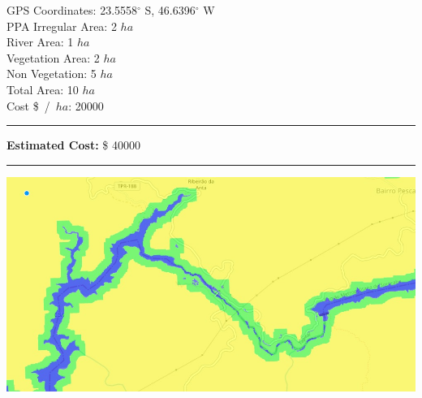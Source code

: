 \documentclass{article}
\begin{document}
    \begin{minipage}{0.5\linewidth}

    GPS Coordinates: 23.5558$^{\circ}$ S, 46.6396$^{\circ}$ W    \\
    PPA Irregular Area: 2 $ha$  \\
    River Area: 1 $ha$              \\
    Vegetation Area: 2 $ha$           \\
    Non Vegetation: 5 $ha$           \\
    Total Area: 10 $ha$              \\
    Cost \$~/~$ha$: 20000               \\
    \rule{\linewidth}{1pt}
    \textbf{Estimated Cost:} \$ 40000           \\
    \rule{\linewidth}{1pt}

    \end{minipage}\hfil
    \begin{minipage}{0.5\linewidth}
        \includegraphics[width=\linewidth]{map.jpg}
    \end{minipage}
    
    

    \pagebreak
\end{document}
